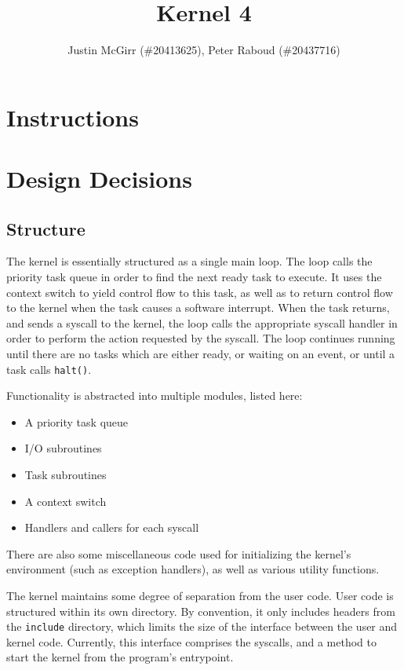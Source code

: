 \documentclass[titlepage]{article}
\begin{document}
\title{Kernel 4}
\author{Justin McGirr (\#20413625), Peter Raboud (\#20437716)}
\maketitle

\section{Instructions}


\section{Design Decisions}
\subsection{Structure}
The kernel is essentially structured as a single main loop.
The loop calls the priority task queue in order to find the next ready task
to execute.
It uses the context switch to yield control flow to this task, as well as to
return control flow to the kernel when the task causes a software interrupt.
When the task returns, and sends a syscall to the kernel, the loop calls
the appropriate syscall handler in order to perform the action requested by
the syscall.
The loop continues running until there are no tasks which are either ready,
or waiting on an event, or until a task calls \texttt{halt()}.

Functionality is abstracted into multiple modules, listed here:

\begin{itemize}
\item A priority task queue
\item I/O subroutines
\item Task subroutines
\item A context switch
\item Handlers and callers for each syscall
\end{itemize}

There are also some miscellaneous code used for initializing the kernel's environment
(such as exception handlers), as well as various utility functions.

The kernel maintains some degree of separation from the user code.
User code is structured within its own directory.
By convention, it only includes headers from the \texttt{include} directory,
which limits the size of the interface between the user and kernel code.
Currently, this interface comprises the syscalls, and a method to start the
kernel from the program's entrypoint.
\end{document}
